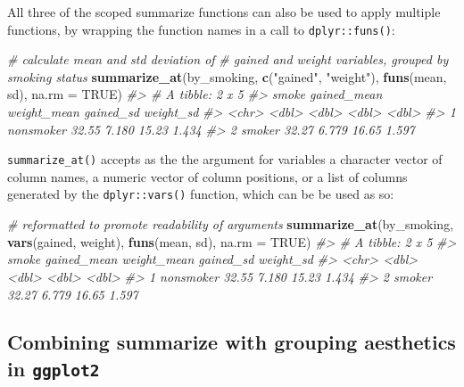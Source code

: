 \documentclass[]{book}
\newenvironment{Shaded}{\begin{snugshade}}{\end{snugshade}}
\newcommand{\CommentTok}[1]{\textcolor[rgb]{0.56,0.35,0.01}{\textit{#1}}}
\newcommand{\DataTypeTok}[1]{\textcolor[rgb]{0.13,0.29,0.53}{#1}}
\newcommand{\KeywordTok}[1]{\textcolor[rgb]{0.13,0.29,0.53}{\textbf{#1}}}
\newcommand{\NormalTok}[1]{#1}
\newcommand{\OtherTok}[1]{\textcolor[rgb]{0.56,0.35,0.01}{#1}}
\newcommand{\StringTok}[1]{\textcolor[rgb]{0.31,0.60,0.02}{#1}}
\theoremstyle{definition}
\theoremstyle{definition}
\theoremstyle{definition}
\theoremstyle{remark}
\begin{document}
All three of the scoped summarize functions can also be used to apply
multiple functions, by wrapping the function names in a call to
\texttt{dplyr::funs()}:

\begin{Shaded}
\begin{Highlighting}[]
\CommentTok{# calculate mean and std deviation of }
\CommentTok{# gained and weight variables, grouped by smoking status}
\KeywordTok{summarize_at}\NormalTok{(by_smoking, }\KeywordTok{c}\NormalTok{(}\StringTok{"gained"}\NormalTok{, }\StringTok{"weight"}\NormalTok{), }\KeywordTok{funs}\NormalTok{(mean, sd), }\DataTypeTok{na.rm =} \OtherTok{TRUE}\NormalTok{)}
\CommentTok{#> # A tibble: 2 x 5}
\CommentTok{#>   smoke     gained_mean weight_mean gained_sd weight_sd}
\CommentTok{#>   <chr>           <dbl>       <dbl>     <dbl>     <dbl>}
\CommentTok{#> 1 nonsmoker       32.55       7.180     15.23     1.434}
\CommentTok{#> 2 smoker          32.27       6.779     16.65     1.597}
\end{Highlighting}
\end{Shaded}

\texttt{summarize\_at()} accepts as the the argument for variables a
character vector of column names, a numeric vector of column positions,
or a list of columns generated by the \texttt{dplyr::vars()} function,
which can be be used as so:

\begin{Shaded}
\begin{Highlighting}[]
\CommentTok{# reformatted to promote readability of arguments}
\KeywordTok{summarize_at}\NormalTok{(by_smoking, }
             \KeywordTok{vars}\NormalTok{(gained, weight),}
             \KeywordTok{funs}\NormalTok{(mean, sd),}
             \DataTypeTok{na.rm =} \OtherTok{TRUE}\NormalTok{)}
\CommentTok{#> # A tibble: 2 x 5}
\CommentTok{#>   smoke     gained_mean weight_mean gained_sd weight_sd}
\CommentTok{#>   <chr>           <dbl>       <dbl>     <dbl>     <dbl>}
\CommentTok{#> 1 nonsmoker       32.55       7.180     15.23     1.434}
\CommentTok{#> 2 smoker          32.27       6.779     16.65     1.597}
\end{Highlighting}
\end{Shaded}

\hypertarget{combining-summarize-with-grouping-aesthetics-in-ggplot2}{%
\subsection{\texorpdfstring{Combining summarize with grouping aesthetics
in
\texttt{ggplot2}}{Combining summarize with grouping aesthetics in ggplot2}}\label{combining-summarize-with-grouping-aesthetics-in-ggplot2}}
\end{document}

